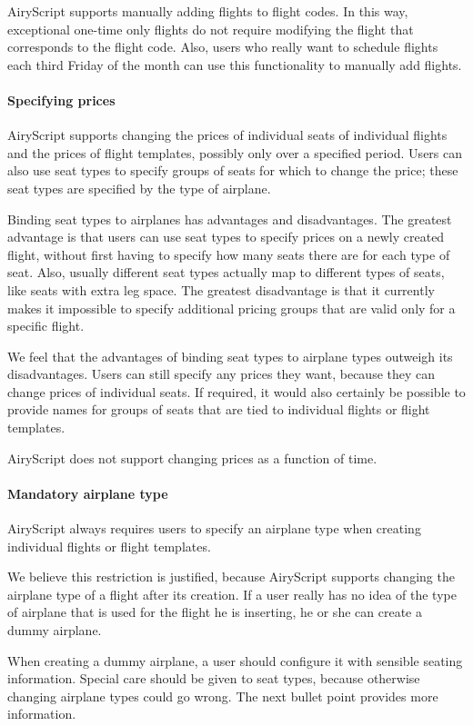 AiryScript supports manually adding flights to flight codes. In this
way, exceptional one-time only flights do not require modifying the flight
that corresponds to the flight code. Also, users who really want to
schedule flights each third Friday of the month can use this functionality
to manually add flights.

\paragraph{Specifying prices}
AiryScript supports changing the prices of individual seats of individual
flights and the prices of flight templates, possibly only over a specified
period. Users can also use seat types to specify groups of seats for which to
change the price; these seat types are specified by the type of airplane.

Binding seat types to airplanes has advantages and disadvantages. The greatest
advantage is that users can use seat types to specify prices on a newly created
flight, without first having to specify how many seats there are for each type
of seat. Also, usually different seat types actually map to different types of
seats, like seats with extra leg space. The greatest disadvantage is that it
currently makes it impossible to specify additional pricing groups that are
valid only for a specific flight.

We feel that the advantages of binding seat types to airplane types outweigh its
disadvantages. Users can still specify any prices they want, because they can
change prices of individual seats. If required, it would also certainly be
possible to provide names for groups of seats that are tied to individual
flights or flight templates.

AiryScript does not support changing prices as a function of time.

\paragraph{Mandatory airplane type}
AiryScript always requires users to specify an airplane type when creating
individual flights or flight templates.

We believe this restriction is justified, because AiryScript supports changing
the airplane type of a flight after its creation. If a user really has no idea
of the type of airplane that is used for the flight he is inserting, he or she
can create a dummy airplane.

When creating a dummy airplane, a user should configure it with sensible seating
information. Special care should be given to seat types, because otherwise
changing airplane types could go wrong. The next bullet point provides more
information.


